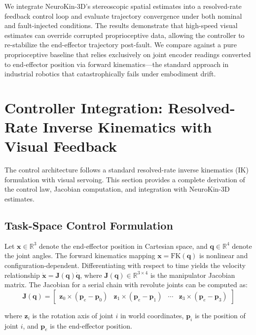 \documentclass[12pt,a4paper,oneside]{report}
\begin{document}
We integrate NeuroKin-3D's stereoscopic spatial estimates into a resolved-rate feedback control loop and evaluate trajectory convergence under both nominal and fault-injected conditions. The results demonstrate that high-speed visual estimates can override corrupted proprioceptive data, allowing the controller to re-stabilize the end-effector trajectory post-fault. We compare against a pure proprioceptive baseline that relies exclusively on joint encoder readings converted to end-effector position via forward kinematics---the standard approach in industrial robotics that catastrophically fails under embodiment drift.
\section{Controller Integration: Resolved-Rate Inverse Kinematics with Visual Feedback}

The control architecture follows a standard resolved-rate inverse kinematics (IK) formulation with visual servoing. This section provides a complete derivation of the control law, Jacobian computation, and integration with NeuroKin-3D estimates.
\subsection{Task-Space Control Formulation}
\label{subsec:task_space_control_formulation}

Let $\mathbf{x} \in \mathbb{R}^3$ denote the end-effector position in Cartesian space, and $\mathbf{q} \in \mathbb{R}^4$ denote the joint angles. The forward kinematics mapping $\mathbf{x} = \text{FK}(\mathbf{q})$ is nonlinear and configuration-dependent. Differentiating with respect to time yields the velocity relationship $\dot{\mathbf{x}} = \mathbf{J}(\mathbf{q}) \dot{\mathbf{q}}$, where $\mathbf{J}(\mathbf{q}) \in \mathbb{R}^{3 \times 4}$ is the manipulator Jacobian matrix. The Jacobian for a serial chain with revolute joints can be computed as:
\begin{equation}\mathbf{J}(\mathbf{q}) = \begin{bmatrix}
\mathbf{z}_0 \times (\mathbf{p}_e - \mathbf{p}_0) & \mathbf{z}_1 \times (\mathbf{p}_e - \mathbf{p}_1) & \cdots & \mathbf{z}_3 \times (\mathbf{p}_e - \mathbf{p}_3)
\end{bmatrix}
\end{equation}

where $\mathbf{z}_i$ is the rotation axis of joint $i$ in world coordinates, $\mathbf{p}_i$ is the position of joint $i$, and $\mathbf{p}_e$ is the end-effector position.
\end{document}
